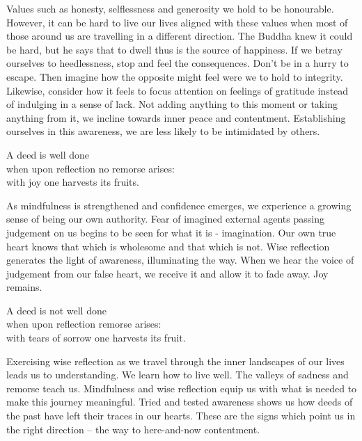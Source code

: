 \begin{dhpRefl}
Values such as honesty, selflessness and generosity we hold to be honourable. However, it can be hard to live our lives aligned with these values when most of those around us are travelling in a different direction. The Buddha knew it could be hard, but he says that to dwell thus is the source of happiness. If we betray ourselves to heedlessness, stop and feel the consequences. Don't be in a hurry to escape. Then imagine how the opposite might feel were we to hold to integrity. Likewise, consider how it feels to focus attention on feelings of gratitude instead of indulging in a sense of lack. Not adding anything to this moment or taking anything from it, we incline towards inner peace and contentment. Establishing ourselves in this awareness, we are less likely to be intimidated by others.
\end{dhpRefl}


\begin{dhpVerse}{68}
\label{dhp-68}
A deed is well done\\
when upon reflection no remorse arises:\\
with joy one harvests its fruits.
\end{dhpVerse}

\begin{dhpRefl}
As mindfulness is strengthened and confidence emerges, we experience a growing sense of being our own authority. Fear of imagined external agents passing judgement on us begins to be seen for what it is - imagination. Our own true heart knows that which is wholesome and that which is not. Wise reflection generates the light of awareness, illuminating the way. When we hear the voice of judgement from our false heart, we receive it and allow it to fade away. Joy remains.
\end{dhpRefl}


\begin{dhpVerse}{67}
\label{dhp-67}
A deed is not well done\\
when upon reflection remorse arises:\\
with tears of sorrow one harvests its fruit.
\end{dhpVerse}

\begin{dhpRefl}
Exercising wise reflection as we travel through the inner landscapes of our lives leads us to understanding. We learn how to live well. The valleys of sadness and remorse teach us. Mindfulness and wise reflection equip us with what is needed to make this journey meaningful. Tried and tested awareness shows us how deeds of the past have left their traces in our hearts. These are the signs which point us in the right direction – the way to here-and-now contentment.
\end{dhpRefl}

